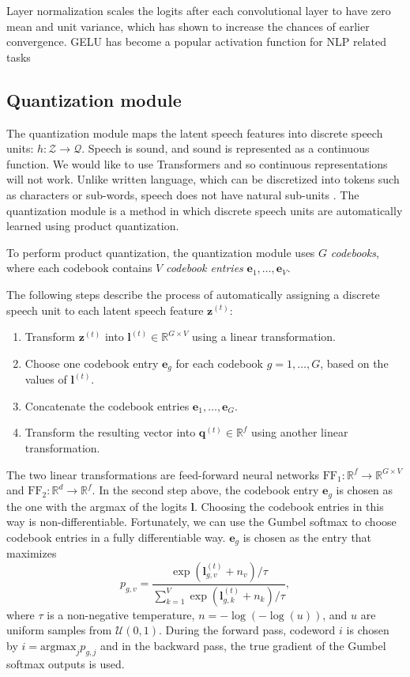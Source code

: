 Layer normalization scales the logits after each convolutional layer to have zero mean and unit variance, which has shown to increase the chances of earlier convergence.
GELU has become a popular activation function for NLP related tasks



\subsection{Quantization module}
The quantization module maps the latent speech features into discrete speech units: $h: \mathcal{Z} \rightarrow \mathcal{Q}$.
Speech is sound, and sound is represented as a continuous function. We would like to use Transformers and so continuous representations will not work. 
Unlike written language, which can be discretized into tokens such as characters or sub-words, speech does not have natural sub-units \cite{bgn2021illustrated}. 
The quantization module is a method in which discrete speech units are automatically learned using product quantization.

To perform product quantization, the quantization module uses $G$ \emph{codebooks}, where each codebook contains $V$ \emph{codebook entries} $\mathbf{e}_{1}, \dots, \mathbf{e}_{V}$.

The following steps describe the process of automatically assigning a discrete speech unit to each latent speech feature $\mathbf{z}^{(t)}$:
\begin{enumerate}
    \item Transform $\mathbf{z}^{(t)}$ into $\mathbf{l}^{(t)} \in \mathbb{R}^{G \times V}$ using a linear transformation.
    \item Choose one codebook entry $\mathbf{e}_g$ for each codebook $g = 1, \dots, G$, based on the values of $\mathbf{l}^{(t)}$.
    \item Concatenate the codebook entries $\mathbf{e}_1, \dots, \mathbf{e}_G$.
    \item Transform the resulting vector into $\mathbf{q}^{(t)} \in \mathbb{R}^{f}$ using another linear transformation.
\end{enumerate}
The two linear transformations are feed-forward neural networks $\text{FF}_1: \mathbb{R}^{f} \rightarrow \mathbb{R}^{G \times V}$ and $\text{FF}_2: \mathbb{R}^{d} \rightarrow \mathbb{R}^{f}$.
In the second step above, the codebook entry $\mathbf{e}_g$ is chosen as the one with the argmax of the logits $\mathbf{l}$. Choosing the codebook entries in this way is non-differentiable.
Fortunately, we can use the Gumbel softmax to choose codebook entries in a fully differentiable way. 
$\mathbf{e}_g$ is chosen as the entry that maximizes
\begin{equation}
    p_{g, v} = \dfrac{\exp{\left(\mathbf{l}^{(t)}_{g, v} + n_v\right)}/\tau}{\sum\limits_{k=1}^{V} \exp{\left(\mathbf{l}^{(t)}_{g, k} + n_k\right)}/\tau},
\end{equation}
where $\tau$ is a non-negative temperature, $n = -\log{(-\log{(u)})}$, and $u$ are uniform samples from $\mathcal{U}(0, 1)$.
During the forward pass, codeword $i$ is chosen by $i = \text{argmax}_j p_{g,j}$ and in the backward pass, the true gradient of the Gumbel softmax outputs is used.



